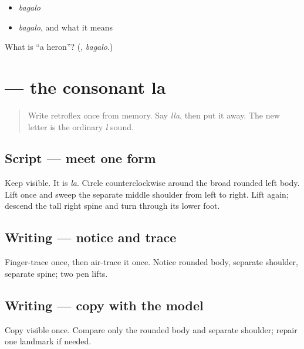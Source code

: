\begin{itemize}
\raggedright
  \item \emph{bagalo}
  \item \emph{bagalo}, and what it means
\end{itemize}

\begin{tcolorbox}[breakable,colback=teal!4,colframe=teal!35!black,title={Before you move on}]
What is \textquotedblleft{}a heron\textquotedblright{}? (\textbf{}, \emph{bagalo}.)
\end{tcolorbox}
\section[\texorpdfstring{\gu{લ} (la)}{લ (la)}]{ — the consonant la}

\label{lesson:GU-W05-la}



\begin{quote}
Write retroflex \textbf{} once from memory. Say \emph{lla}, then put it away. The new letter is the ordinary \emph{l} sound.
\end{quote}

\subsection*{Script — meet one form}
Keep \textbf{} visible. It is \emph{la}. Circle counterclockwise around the broad rounded left body. Lift once and sweep the separate middle shoulder from left to right. Lift again; descend the tall right spine and turn through its lower foot.

\subsection*{Writing — notice and trace}

Finger-trace \textbf{} once, then air-trace it once. Notice rounded body, separate shoulder, separate spine; two pen lifts.

\subsection*{Writing — copy with the model}
Copy visible \textbf{} once. Compare only the rounded body and separate shoulder; repair one landmark if needed.

